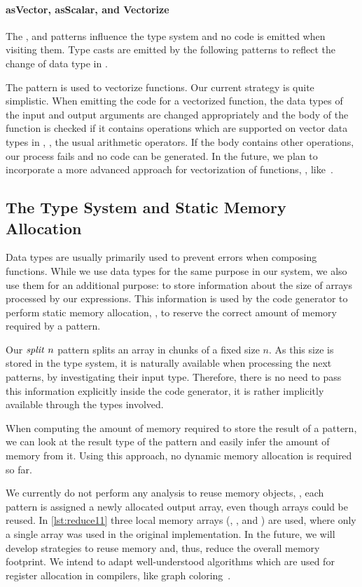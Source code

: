 \paragraph{{\footnotesize as}Vector, {\footnotesize as}Scalar, and Vectorize}
The \asVector, and \asScalar patterns influence the type system and no \OpenCL code is emitted when visiting them.
Type casts are emitted by the following patterns to reflect the change of data type in \OpenCL.

The \vect pattern is used to vectorize functions.
Our current strategy is quite simplistic.
When emitting the \OpenCL code for a vectorized function, the data types of the input and output arguments are changed appropriately and the body of the function is checked if it contains operations which are supported on vector data types in \OpenCL, \eg, the usual arithmetic operators.
If the body contains other operations, our process fails and no \OpenCL code can be generated.
In the future, we plan to incorporate a more advanced approach for vectorization of functions, \eg, like~\cite{KarrenbergHa2011}.


\subsection{The Type System and Static Memory Allocation}
\label{section:typeSystem}
Data types are usually primarily used to prevent errors when composing functions.
While we use data types for the same purpose in our system, we also use them for an additional purpose: to store information about the size of arrays processed by our expressions.
This information is used by the code generator to perform static memory allocation, \ie, to reserve the correct amount of memory required by a pattern.

Our $\text{\textit{split}}\ n$ pattern splits an array in chunks of a fixed size $n$.
As this size is stored in the type system, it is naturally available when processing the next patterns, by investigating their input type.
Therefore, there is no need to pass this information explicitly inside the code generator, it is rather implicitly available through the types involved.

When computing the amount of memory required to store the result of a pattern, we can look at the result type of the pattern and easily infer the amount of memory from it.
Using this approach, no dynamic memory allocation is required so far.

We currently do not perform any analysis to reuse memory objects, \ie, each pattern is assigned a newly allocated output array, even though arrays could be reused.
In \autoref{lst:reduce11} three local memory arrays (, , and ) are used, where only a single array was used in the original \OpenCL implementation.
In the future, we will develop strategies to reuse memory and, thus, reduce the overall memory footprint.
We intend to adapt well-understood algorithms which are used for register allocation in compilers, like graph coloring~\cite{CooperTo2004}.

